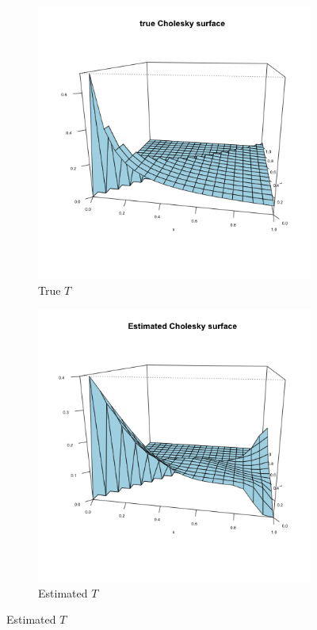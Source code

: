 \documentclass[12pt]{article}
\theoremstyle{definition}
\begin{document}
  \begin{center}
\begin{figure}[H]
 \begin{subfigure}{.48\textwidth}
 \includegraphics{img/compound-symmetry-true-cholesky}
 \caption{True $T$ }
 \end{subfigure}
 \begin{subfigure}{.48\textwidth}
  \includegraphics{img/compound-symmetry-estimated-cholesky}
 \caption{Estimated $T$}
 \end{subfigure}
\end{figure}
\end{center}
\end{document}
